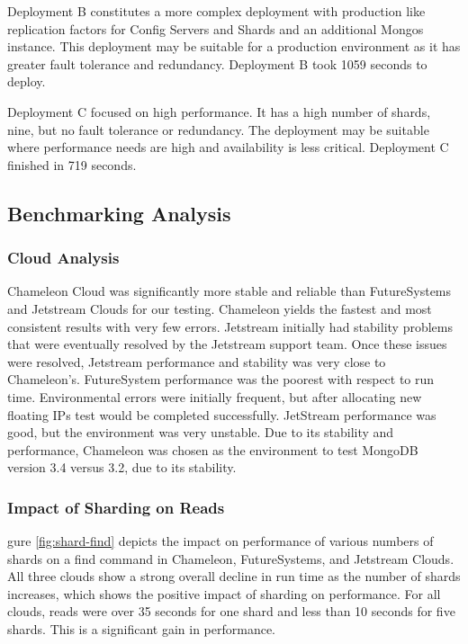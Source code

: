 \documentclass[sigconf]{acmart}
\begin{document}
Deployment B constitutes a more complex deployment with production like
replication factors for Config Servers and Shards and an additional
Mongos instance.  This deployment may be suitable for a production
environment as it has greater fault tolerance and redundancy.
Deployment B took 1059 seconds to deploy.

Deployment C focused on high performance.  It has a high number of
shards, nine, but no fault tolerance or redundancy.  The deployment
may be suitable where performance needs are high and availability is
less critical.  Deployment C finished in 719 seconds.



\subsection{Benchmarking Analysis}


\subsubsection{Cloud Analysis}

Chameleon Cloud was significantly more stable and reliable than
FutureSystems and Jetstream Clouds for our testing.  Chameleon yields
the fastest and most consistent results with very few errors.
Jetstream initially had stability problems that were eventually
resolved by the Jetstream support team.  Once these issues were
resolved, Jetstream performance and stability was very close to
Chameleon's.  FutureSystem performance was the poorest with respect to
run time.  Environmental errors were initially frequent, but after
allocating new floating IPs test would be completed successfully.
JetStream performance was good, but the environment was very unstable.
Due to its stability and performance, Chameleon was chosen as the
environment to test MongoDB version 3.4 versus 3.2, due to its
stability.

\subsubsection{Impact of Sharding on Reads}


gure \ref{fig:shard-find} depicts the impact on performance of various
numbers of shards on a find command in Chameleon, FutureSystems, and
Jetstream Clouds.  All three clouds show a strong overall decline in
run time as the number of shards increases, which shows the positive
impact of sharding on performance.  For all clouds, reads were over 35
seconds for one shard and less than 10 seconds for five shards.  This
is a significant gain in performance.
\end{document}

